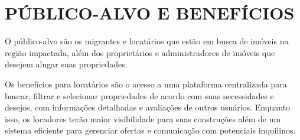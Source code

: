 \section{PÚBLICO-ALVO E BENEFÍCIOS}
O público-alvo são os  migrantes e locatários que estão em busca de imóveis na região impactada, além dos proprietários e administradores de imóveis que desejem alugar suas propriedades.

Os benefícios para locatários são o acesso a uma plataforma centralizada para buscar, filtrar e selecionar propriedades de acordo com suas necessidades e desejos, com informações detalhadas e avaliações de outros usuários. Enquanto isso, os locadores terão maior visibilidade para suas construções além de um sistema eficiente para gerenciar ofertas e comunicação com potenciais inquilinos.




